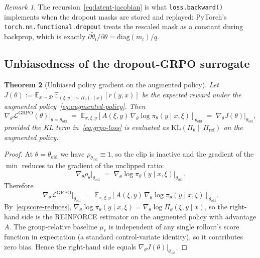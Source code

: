 \documentclass[11pt]{article}
\newtheorem{theorem}{Theorem}
\theoremstyle{definition}
\theoremstyle{remark}
\newtheorem{remark}[theorem]{Remark}
\newcommand{\E}{\mathbb{E}}
\newcommand{\KL}{\mathrm{KL}}
\newcommand{\D}{\mathcal{D}}
\newcommand{\Loss}{\mathcal{L}}
\newcommand{\old}{\mathrm{old}}
\begin{document}
\begin{remark}
The recursion~\eqref{eq:latent-jacobian} is what \texttt{loss.backward()}
implements when the dropout masks are stored and replayed: PyTorch's
\texttt{torch.nn.functional.dropout} treats the rescaled mask as a constant
during backprop, which is exactly $\partial \tilde\theta_t/\partial \theta =
\mathrm{diag}(m_t)/q$.
\end{remark}

\subsection{Unbiasedness of the dropout-GRPO surrogate}

\begin{theorem}[Unbiased policy gradient on the augmented policy]
\label{thm:unbiased}
Let $J(\theta) := \E_{x\sim\D}\,\E_{(\xi,y)\sim\Pi_\theta(\cdot\mid x)}[r(y,x)]$
be the expected reward under the augmented policy~\eqref{eq:augmented-policy}.
Then
\begin{equation}
\nabla_\theta \Loss^{\mathrm{GRPO}}(\theta)\Big|_{\theta=\theta_\old}
  \;=\;
\E_{x,\xi,y}\!\left[A(\xi, y)\,
       \nabla_\theta \log \pi_\theta(y\mid x,\xi)\right]_{\theta_\old}
  \;=\;
\nabla_\theta J(\theta)\Big|_{\theta_\old},
\label{eq:unbiased}
\end{equation}
provided the KL term in~\eqref{eq:grpo-loss} is evaluated as
$\KL(\Pi_\theta \| \Pi_\mathrm{ref})$ on the augmented policy.
\end{theorem}

\begin{proof}
At $\theta = \theta_\old$ we have $\rho_{\theta_\old} \equiv 1$, so the clip is
inactive and the gradient of the $\min$ reduces to the gradient of the unclipped
ratio:
\[
\nabla_\theta \rho_\theta\big|_{\theta_\old}
   \;=\;
\nabla_\theta \log \pi_\theta(y\mid x,\xi)\big|_{\theta_\old}.
\]
Therefore
\begin{equation}
\nabla_\theta \Loss^{\mathrm{GRPO}}\big|_{\theta_\old}
  \;=\;
\E_{x,\xi,y}\!\left[A(\xi,y)\,\nabla_\theta\log\pi_\theta(y\mid x,\xi)\right]_{\theta_\old}.
\label{eq:proof-step1}
\end{equation}
By~\eqref{eq:score-reduces},
$\nabla_\theta\log\pi_\theta(y\mid x,\xi)
   = \nabla_\theta\log \Pi_\theta(\xi,y\mid x)$, so the right-hand side is the
REINFORCE estimator on the augmented policy with advantage $A$.  The
group-relative baseline $\mu_r$ is independent of any single rollout's score
function in expectation (a standard control-variate identity), so it
contributes zero bias.  Hence the right-hand side equals
$\nabla_\theta J(\theta)|_{\theta_\old}$.
\end{proof}
\end{document}
